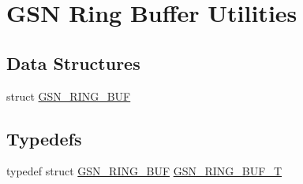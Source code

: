 \hypertarget{a00632}{
\section{GSN Ring Buffer Utilities}
\label{a00632}
}
\subsection*{Data Structures}
\begin{DoxyCompactItemize}
\item 
struct \hyperlink{a00191}{GSN\_\-RING\_\-BUF}
\end{DoxyCompactItemize}
\subsection*{Typedefs}
\begin{DoxyCompactItemize}
\item 
typedef struct \hyperlink{a00191}{GSN\_\-RING\_\-BUF} \hyperlink{a00632_gaca5ec9760102d4664831e7f6614766bc}{GSN\_\-RING\_\-BUF\_\-T}
\end{DoxyCompactItemize}
